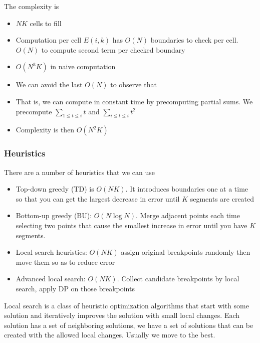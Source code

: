         The complexity is 
        \begin{itemize}
            \item $NK$ cells to fill
            \item Computation per cell $E(i, k)$ has $O(N)$ boundaries to check per cell. $O(N)$ to compute second term per checked boundary
            \item $O(N^3K)$ in naive computation
            \item We can avoid the last $O(N)$ to observe that 
            \item That is, we can compute in constant time by precomputing partial sums. We precompute $\sum_{1 \leq t \leq i}t$ and $\sum_{i \leq t \leq i}t^2$
            \item Complexity is then $O(N^2K)$
        \end{itemize}
        
\subsubsection{Heuristics}
    There are a number of heuristics that we can use
    \begin{itemize}
        \item Top-down greedy (TD) is $O(NK)$. It introduces boundaries one at a time so that you can get the largest decrease in error until $K$ segments are created
        \item Bottom-up greedy (BU): $O(N \log N)$. Merge adjacent points each time selecting two points that cause the smallest increase in error until you have $K$ segments. 
        \item Local search heuristics: $O(NK)$ assign original breakpoints randomly then move them so as to reduce error
        \item Advanced local search: $O(NK)$. Collect candidate breakpoints by local search, apply DP on those breakpoints
    \end{itemize}
    
    Local search is a class of heuristic optimization algorithms that start with some solution and iteratively improves the solution with small local changes. Each solution has a set of neighboring solutions, we have a set of solutions that can be created with the allowed local changes. Usually we move to the best.
    
